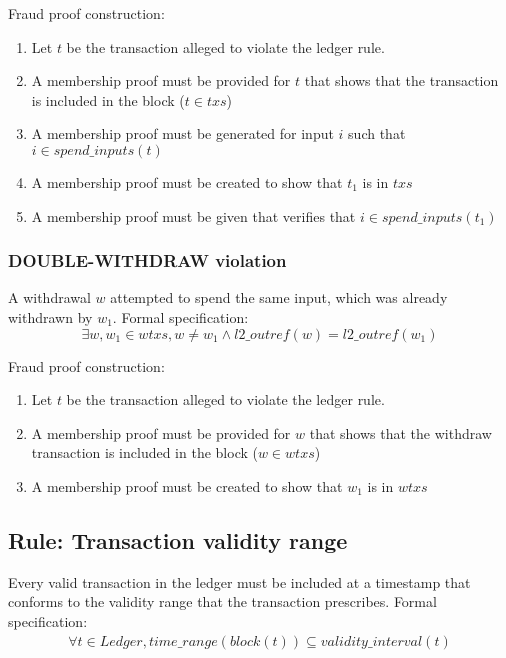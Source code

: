 \documentclass[../midgard.tex]{subfiles}
\begin{document}
Fraud proof construction:
\begin{enumerate}
  \item Let $t$ be the transaction alleged to violate the ledger rule. 
  \item A membership proof must be provided for $t$ that shows that the transaction is included in the block ($t \in txs$)
  \item A membership proof must be generated for input $i$ such that $i \in spend\_inputs(t)$
  \item A membership proof must be created to show that $t_1$ is in $txs$
  \item A membership proof must be given that verifies that $i \in spend\_inputs(t_1)$
\end{enumerate}

\subsubsection{DOUBLE-WITHDRAW violation}
\label{violation:DOUBLE-WITHDRAW}
A withdrawal $w$ attempted to spend the same input, which was already withdrawn by $w_1$.
Formal specification:
\begin{equation*}
    \exists w, w_1 \in wtxs, w \neq w_1 \land l2\_outref(w) = l2\_outref(w_1)
\end{equation*}

Fraud proof construction:
\begin{enumerate}
  \item Let $t$ be the transaction alleged to violate the ledger rule. 
  \item A membership proof must be provided for $w$ that shows that the withdraw transaction is included in the block ($w \in wtxs$)
  \item A membership proof must be created to show that $w_1$ is in $wtxs$
\end{enumerate}

\subsection{Rule: Transaction validity range}
\label{rule:transaction-validity-range}
Every valid transaction in the ledger must be included at a timestamp that conforms to the validity range that the transaction prescribes.
Formal specification:
\todo
\begin{equation*}
\begin{split}
    \forall t \in Ledger, time\_range(block(t)) \subseteq validity\_interval(t)
\end{split}
\end{equation*}
\end{document}

